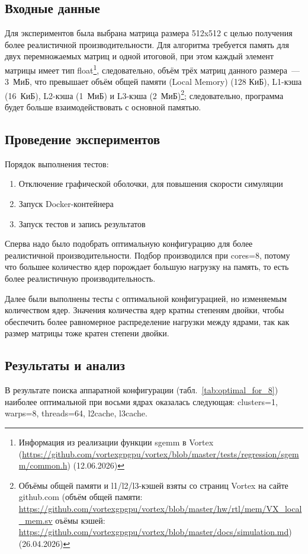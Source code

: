 \documentclass[a4paper]{article}
\begin{document}
\subsection*{Входные данные}
Для экспериментов была выбрана матрица размера 512x512 с целью получения более реалистичной производительности. Для алгоритма требуется память для двух перемножаемых матриц и одной итоговой, при этом каждый элемент матрицы имеет тип float\footnote{Информация из реализации функции sgemm в Vortex (\url{https://github.com/vortexgpgpu/vortex/blob/master/tests/regression/sgemm/common.h}) (12.06.2026)}, следовательно, объём трёх матриц данного размера~--- 3~МиБ, что превышает объём общей памяти (Local Memory) (128 КиБ), L1-кэша (16~КиБ), L2-кэша (1~МиБ) и L3-кэша (2~МиБ)\footnote{Объёмы общей памяти и l1/l2/l3-кэшей взяты со страниц Vortex на сайте github.com (объём общей памяти: \url{https://github.com/vortexgpgpu/vortex/blob/master/hw/rtl/mem/VX_local_mem.sv} оъёмы кэшей: \url{https://github.com/vortexgpgpu/vortex/blob/master/docs/simulation.md}) (26.04.2026)}; следовательно, программа будет больше взаимодействовать с основной памятью.

\subsection*{Проведение экспериментов}

Порядок выполнения тестов:
\begin{enumerate}
    \item Отключение графической оболочки, для повышения скорости симуляции
    \item Запуск Docker-контейнера
    \item Запуск тестов и запись результатов
\end{enumerate}

Сперва надо было подобрать оптимальную конфигурацию для более реалистичной производительности. Подбор производился при cores=8, потому что большее количество ядер порождает большую нагрузку на память, то есть более реалистичную производительность.

Далее были выполнены тесты с оптимальной конфигурацией, но изменяемым количеством ядер. Значения количества ядер кратны степеням двойки, чтобы обеспечить более равномерное распределение нагрузки между ядрами, так как размер матрицы тоже кратен степени двойки.

\subsection*{Результаты и анализ}
В результате поиска аппаратной конфигурации (табл.~\ref{tab:optimal_for_8}) наиболее оптимальной при восьми ядрах оказалась следующая: clusters=1, warps=8, threads=64, l2cache, l3cache.
\end{document}
